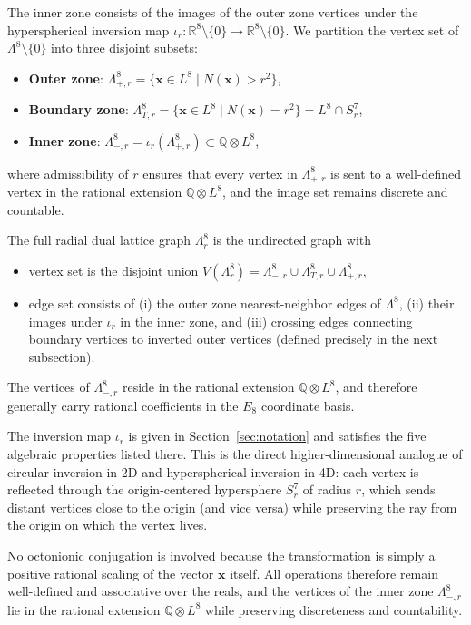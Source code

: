 \documentclass{article}
\begin{document}
The inner zone consists of the images of the outer zone vertices under the hyperspherical inversion map $\iota_r : \mathbb{R}^8 \setminus \{0\} \to \mathbb{R}^8 \setminus \{0\}$. We partition the vertex set of \(\Lambda^8 \setminus \{0\}\) into three disjoint subsets:
\begin{itemize}
  \item \textbf{Outer zone}: $\Lambda_{+,r}^8 = \{\mathbf{x} \in L^8 \mid N(\mathbf{x}) > r^2 \}$,
  \item \textbf{Boundary zone}: $\Lambda_{T,r}^8 = \{\mathbf{x} \in L^8 \mid N(\mathbf{x}) = r^2 \} = L^8 \cap S_r^7$,
  \item \textbf{Inner zone}: $\Lambda_{-,r}^8 = \iota_r(\Lambda_{+,r}^8) \subset \mathbb{Q} \otimes L^8$,
\end{itemize}
where admissibility of $r$ ensures that every vertex in \(\Lambda_{+,r}^8\) is sent to a well-defined vertex in the rational extension \(\mathbb{Q} \otimes L^8\), and the image set remains discrete and countable.

The full radial dual lattice graph $\Lambda_r^8$ is the undirected graph with
\begin{itemize}
  \item vertex set is the disjoint union $V(\Lambda_r^8) = \Lambda_{-,r}^8 \cup \Lambda_{T,r}^8 \cup \Lambda_{+,r}^8$,
  \item edge set consists of (i) the outer zone nearest-neighbor edges of $\Lambda^8$, (ii) their images under $\iota_r$ in the inner zone, and (iii) crossing edges connecting boundary vertices to inverted outer vertices (defined precisely in the next subsection).
\end{itemize}
The vertices of $\Lambda_{-,r}^8$ reside in the rational extension $\mathbb{Q} \otimes L^8$, and therefore generally carry rational coefficients in the $E_8$ coordinate basis.

The inversion map \(\iota_r\) is given in Section~\ref{sec:notation} and satisfies the five algebraic properties listed there. This is the direct higher-dimensional analogue of circular inversion in 2D and hyperspherical inversion in 4D: each vertex is reflected through the origin-centered hypersphere \(S_r^7\) of radius \(r\), which sends distant vertices close to the origin (and vice versa) while preserving the ray from the origin on which the vertex lives.

No octonionic conjugation is involved because the transformation is simply a positive rational scaling of the vector \(\mathbf{x}\) itself. All operations therefore remain well-defined and associative over the reals, and the vertices of the inner zone \(\Lambda_{-,r}^8\) lie in the rational extension \(\mathbb{Q} \otimes L^8\) while preserving discreteness and countability.
\end{document}
